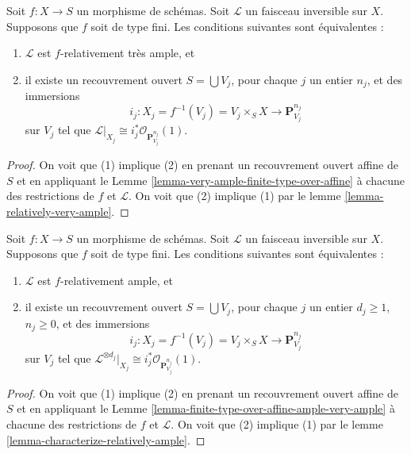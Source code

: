 \begin{lemma}
\label{lemma-characterize-very-ample-on-finite-type}
Soit $f : X \to S$ un morphisme de schémas. Soit $\mathcal{L}$
un faisceau inversible sur $X$. Supposons que $f$
soit de type fini. Les conditions
suivantes sont équivalentes :
\begin{enumerate}
\item $\mathcal{L}$ est $f$-relativement très ample, et
\item il existe un recouvrement ouvert $S = \bigcup V_j$, pour chaque
$j$ un entier $n_j$, et des immersions
$$
i_j :
X_j = f^{-1}(V_j) = V_j \times_S X
\longrightarrow
\mathbf{P}^{n_j}_{V_j}
$$
sur $V_j$
tel que $\mathcal{L}|_{X_j} \cong i_j^*\mathcal{O}_{\mathbf{P}^{n_j}_{V_j}}(1)$.
\end{enumerate}
\end{lemma}

\begin{proof}
On voit que (1) implique (2) en prenant un recouvrement ouvert
affine de $S$ et en appliquant le Lemme \ref{lemma-very-ample-finite-type-over-affine} à chacune
des restrictions de $f$
et $\mathcal{L}$. On voit que (2) implique
(1) par le lemme \ref{lemma-relatively-very-ample}.
\end{proof}

\begin{lemma}
\label{lemma-characterize-ample-on-finite-type}
Soit $f : X \to S$ un morphisme de schémas. Soit $\mathcal{L}$
un faisceau inversible sur $X$. Supposons que $f$
soit de type fini. Les conditions
suivantes sont équivalentes :
\begin{enumerate}
\item $\mathcal{L}$ est $f$-relativement ample, et
\item il existe un recouvrement ouvert $S = \bigcup V_j$, pour chaque
$j$ un entier $d_j \geq 1$, $n_j \geq 0$,
et des immersions
$$
i_j :
X_j = f^{-1}(V_j) = V_j \times_S X
\longrightarrow
\mathbf{P}^{n_j}_{V_j}
$$
sur $V_j$ tel que
$\mathcal{L}^{\otimes d_j}|_{X_j} \cong
i_j^*\mathcal{O}_{\mathbf{P}^{n_j}_{V_j}}(1)$.
\end{enumerate}
\end{lemma}

\begin{proof}
On voit que (1) implique (2) en prenant un recouvrement ouvert
affine de $S$ et en appliquant le Lemme \ref{lemma-finite-type-over-affine-ample-very-ample} à
chacune des restrictions de $f$
et $\mathcal{L}$. On voit que (2)
implique (1) par le lemme \ref{lemma-characterize-relatively-ample}.
\end{proof}

